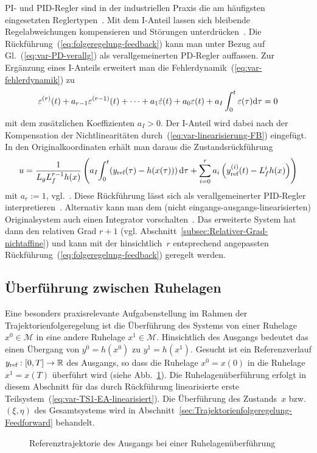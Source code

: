 \begin{remark}
\label{rem:PI-Feedback}PI- und PID-Regler sind in der industriellen
Praxis die am häufigsten eingesetzten Reglertypen~\cite{marlin2000,odwyer2009handbook}.
Mit dem I-Anteil lassen sich bleibende Regelabweichungen kompensieren
und Störungen unterdrücken~\cite{datta2000}. Die Rückführung~(\ref{eq:folgeregelung-feedback})
kann man unter Bezug auf Gl.~(\ref{eq:var-PD-verallg}) als verallgemeinerten
PD-Regler auffassen. Zur Ergänzung eines I-Anteils
erweitert man die Fehlerdynamik~(\ref{eq:var-fehlerdynamik}) zu
\[
\varepsilon^{(r)}(t)+a_{r-1}\varepsilon^{(r-1)}(t)+\cdots+a_{1}\dot{\varepsilon}(t)+a_{0}\varepsilon(t)+a_{I}\int_{0}^{t}\varepsilon(\tau){\mathrm{d}}\tau=0
\]
mit dem zusätzlichen Koeffizienten $a_{I}>0$. Der I-Anteil wird dabei
nach der Kompensation der Nichtlinearitäten durch~(\ref{eq:var-linearisierung-FB})
eingefügt. In den Originalkoordinaten erhält man daraus die Zustandsrückführung
\[
u=\frac{1}{L_{g}L_{f}^{r-1}h(x)}\left(a_{I}\!\int_{0}^{t}\!\left(y_{\text{ref}}(\tau)-h(x(\tau))\right){\mathrm{d}}\tau+\sum_{i=0}^{r}a_{i}\left(y_{\text{ref}}^{(i)}(t)-L_{f}^{i}h(x)\right)\right)
\]
mit $a_{r}:=1$, vgl.~\cite{kravaris1987,henson1991critique}. Diese
Rückführung lässt sich als verallgemeinerter PID-Regler
interpretieren~\cite{sira-ramirez2002gpid}. Alternativ kann man
dem (nicht eingangs-ausgangs-linearisierten) Originalsystem auch einen
Integrator vorschalten~\cite{mahout2003}. Das erweiterte System
hat dann den relativen Grad $r+1$ (vgl. Abschnitt~\ref{subsec:Relativer-Grad-nichtaffine})
und kann mit der hinsichtlich~$r$ entsprechend an\-ge\-passten
Rückführung~(\ref{eq:folgeregelung-feedback}) geregelt werden.
\end{remark}

\subsection{Überführung zwischen Ruhelagen\label{subsec:Ueberfuehrung-zwischen-Ruhelagen}}

Eine besonders praxisrelevante Aufgabenstellung im Rahmen der Trajektorienfolgeregelung
ist die Überführung des Systems von einer Ruhelage $x^{0}\in\mathcal{M}$
in eine andere Ruhelage $x^{1}\in\mathcal{M}$. Hinsichtlich des Ausgangs
bedeutet das einen Übergang von $y^{0}=h(x^{0})$ zu $y^{1}=h(x^{1})$.
Gesucht ist ein Referenzverlauf $y_{\text{ref}}:[0,T]\to{\mathbb{R}}$ des Ausgangs,
so dass die Ruhelage $x^{0}=x(0)$ in die Ruhelage $x^{1}=x(T)$ überführt
wird (siehe Abb.~\ref{fig:Referenztrajektorie-Ausgang}). Die Ruhelagenüberführung
erfolgt in diesem Abschnitt für das durch Rückführung linearisierte
erste Teil\-system~(\ref{eq:var-TS1-EA-linearisiert}). Die Überführung
des Zustands~$x$ bzw. $(\xi,\eta)$ des Gesamtsystems wird in Abschnitt~\ref{sec:Trajektorienfolgeregelung-Feedforward}
behandelt. 
\begin{figure}
\begin{centering}
\resizebox{0.7\textwidth}{!}{}
\par\end{centering}
\caption{Referenztrajektorie des Ausgangs bei einer Ruhelagenüberführung\label{fig:Referenztrajektorie-Ausgang}}
\end{figure}


